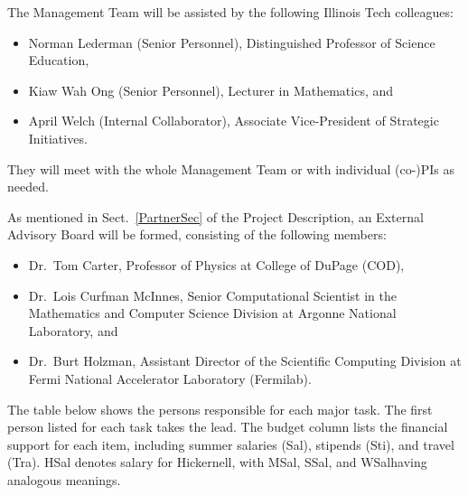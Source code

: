 \documentclass[11pt]{NSFamsart}
\begin{document}
The Management Team will be assisted by the following Illinois Tech colleagues:
\begin{itemize}
\item Norman Lederman (Senior Personnel), Distinguished Professor of Science Education,
\item Kiaw Wah Ong  (Senior Personnel), Lecturer in Mathematics, and 
\item April Welch (Internal Collaborator), Associate Vice-President of Strategic Initiatives. \end{itemize}
They will meet with the whole Management Team or with individual (co-)PIs as needed.

As mentioned in Sect.\ \ref{PartnerSec} of the Project Description, an External Advisory Board will be formed, consisting of the following members:
\begin{itemize}
\item Dr.~Tom Carter, Professor of Physics at College of DuPage (COD),

\item Dr.~Lois Curfman McInnes, Senior Computational Scientist in the Mathematics and Computer Science Division at Argonne National Laboratory, and

\item Dr.~Burt Holzman, Assistant Director of the Scientific Computing
Division at Fermi National Accelerator Laboratory (Fermilab).

\end{itemize}

\newcommand{\Salaries}{Sal}
\newcommand{\Stipends}{Sti}
\newcommand{\Travel}{Tra}




The table below shows the persons responsible for each major task.  The first person listed for each task takes the lead.  The budget column lists the financial support for each item, including summer salaries (\Salaries), stipends (\Stipends), and travel (\Travel).  HSal denotes salary for Hickernell, with M\Salaries, S\Salaries, and W\Salaries having analogous meanings.
\end{document}
